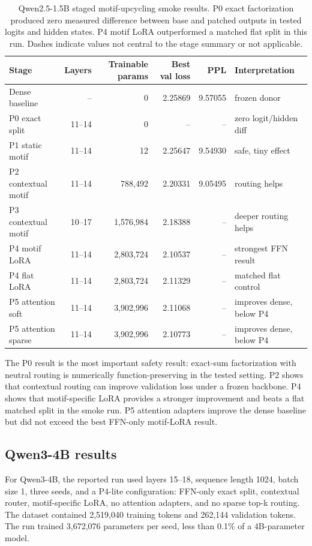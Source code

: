 \documentclass[11pt]{article}
\theoremstyle{definition}
\begin{document}
\begin{table}[h]
\centering
\small
\begin{tabular}{lrrrrl}
\toprule
Stage & Layers & Trainable params & Best val loss & PPL & Interpretation \\
\midrule
Dense baseline & -- & 0 & 2.25869 & 9.57055 & frozen donor \\
P0 exact split & 11--14 & 0 & -- & -- & zero logit/hidden diff \\
P1 static motif & 11--14 & 12 & 2.25647 & 9.54930 & safe, tiny effect \\
P2 contextual motif & 11--14 & 788,492 & 2.20331 & 9.05495 & routing helps \\
P3 contextual motif & 10--17 & 1,576,984 & 2.18388 & -- & deeper routing helps \\
P4 motif LoRA & 11--14 & 2,803,724 & 2.10537 & -- & strongest FFN result \\
P4 flat LoRA & 11--14 & 2,803,724 & 2.11329 & -- & matched flat control \\
P5 attention soft & 11--14 & 3,902,996 & 2.11068 & -- & improves dense, below P4 \\
P5 attention sparse & 11--14 & 3,902,996 & 2.10773 & -- & improves dense, below P4 \\
\bottomrule
\end{tabular}
\caption{Qwen2.5-1.5B staged motif-upcycling smoke results. P0 exact factorization produced zero measured difference between base and patched outputs in tested logits and hidden states. P4 motif LoRA outperformed a matched flat split in this run. Dashes indicate values not central to the stage summary or not applicable.}
\label{tab:qwen25}
\end{table}

The P0 result is the most important safety result: exact-sum factorization with neutral routing is numerically function-preserving in the tested setting. P2 shows that contextual routing can improve validation loss under a frozen backbone. P4 shows that motif-specific LoRA provides a stronger improvement and beats a flat matched split in the smoke run. P5 attention adapters improve the dense baseline but did not exceed the best FFN-only motif-LoRA result.

\subsection{Qwen3-4B results}

For Qwen3-4B, the reported run used layers 15--18, sequence length 1024, batch size 1, three seeds, and a P4-lite configuration: FFN-only exact split, contextual router, motif-specific LoRA, no attention adapters, and no sparse top-k routing. The dataset contained 2,519,040 training tokens and 262,144 validation tokens. The run trained 3,672,076 parameters per seed, less than 0.1\% of a 4B-parameter model.
\end{document}
